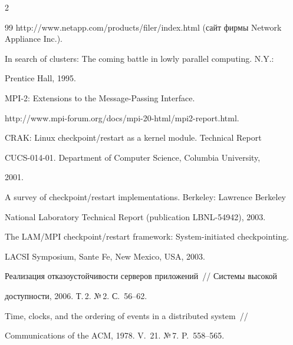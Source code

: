 \begin{multicols}{2}
{{\begin{thebibliography}{99}
{http://www.netapp.com/products/filer/index.html} (сайт фирмы Network Appliance Inc.).



In search of clusters: The coming battle in lowly parallel computing. N.Y.:

Prentice Hall, 1995.


MPI-2: Extensions to the Message-Passing Interface.

{\sf http://www.mpi-forum.org/docs/mpi-20-html/mpi2-report.html}.





CRAK: Linux checkpoint/restart as a kernel module. Technical Report

CUCS-014-01. Department of Computer Science, Columbia University,

2001.





A survey of checkpoint/restart implementations. Berkeley: Lawrence Berkeley

National Laboratory Technical Report (publication LBNL-54942), 2003.





The LAM/MPI checkpoint/restart framework: System-initiated checkpointing.

LACSI Symposium, Sante Fe, New Mexico, USA, 2003.





Реализация отказоустойчивости серверов приложений~// Системы высокой

доступности, 2006. Т.\,2. №\,2. С.~56--62.





Time, clocks, and the ordering of events in a distributed system~//

Communications of the ACM, 1978. V.~21. №\,7. P.~558--565.




\end{thebibliography}}}
\end{multicols}
